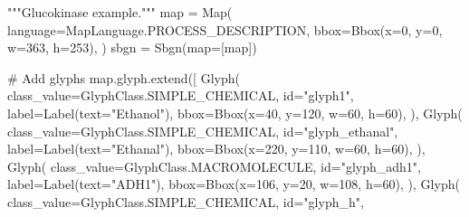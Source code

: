 \documentclass[
  letterpaper,
  DIV=11,
  numbers=noendperiod]{scrartcl}
\newenvironment{Shaded}{\begin{snugshade}}{\end{snugshade}}
\newcommand{\BuiltInTok}[1]{\textcolor[rgb]{0.00,0.23,0.31}{#1}}
\newcommand{\CommentTok}[1]{\textcolor[rgb]{0.37,0.37,0.37}{#1}}
\newcommand{\DecValTok}[1]{\textcolor[rgb]{0.68,0.00,0.00}{#1}}
\newcommand{\NormalTok}[1]{\textcolor[rgb]{0.00,0.23,0.31}{#1}}
\newcommand{\OperatorTok}[1]{\textcolor[rgb]{0.37,0.37,0.37}{#1}}
\newcommand{\StringTok}[1]{\textcolor[rgb]{0.13,0.47,0.30}{#1}}
\begin{document}
\begin{Shaded}
\begin{Highlighting}[]
\CommentTok{"""Glucokinase example."""}
\BuiltInTok{map} \OperatorTok{=}\NormalTok{ Map(}
\NormalTok{    language}\OperatorTok{=}\NormalTok{MapLanguage.PROCESS\_DESCRIPTION,}
\NormalTok{    bbox}\OperatorTok{=}\NormalTok{Bbox(x}\OperatorTok{=}\DecValTok{0}\NormalTok{, y}\OperatorTok{=}\DecValTok{0}\NormalTok{, w}\OperatorTok{=}\DecValTok{363}\NormalTok{, h}\OperatorTok{=}\DecValTok{253}\NormalTok{),}
\NormalTok{)}
\NormalTok{sbgn }\OperatorTok{=}\NormalTok{ Sbgn(}\BuiltInTok{map}\OperatorTok{=}\NormalTok{[}\BuiltInTok{map}\NormalTok{])}

\CommentTok{\# Add glyphs}
\BuiltInTok{map}\NormalTok{.glyph.extend([}
\NormalTok{    Glyph(}
\NormalTok{        class\_value}\OperatorTok{=}\NormalTok{GlyphClass.SIMPLE\_CHEMICAL,}
        \BuiltInTok{id}\OperatorTok{=}\StringTok{"glyph1"}\NormalTok{,}
\NormalTok{        label}\OperatorTok{=}\NormalTok{Label(text}\OperatorTok{=}\StringTok{"Ethanol"}\NormalTok{),}
\NormalTok{        bbox}\OperatorTok{=}\NormalTok{Bbox(x}\OperatorTok{=}\DecValTok{40}\NormalTok{, y}\OperatorTok{=}\DecValTok{120}\NormalTok{, w}\OperatorTok{=}\DecValTok{60}\NormalTok{, h}\OperatorTok{=}\DecValTok{60}\NormalTok{),}
\NormalTok{    ),}
\NormalTok{    Glyph(}
\NormalTok{        class\_value}\OperatorTok{=}\NormalTok{GlyphClass.SIMPLE\_CHEMICAL,}
        \BuiltInTok{id}\OperatorTok{=}\StringTok{"glyph\_ethanal"}\NormalTok{,}
\NormalTok{        label}\OperatorTok{=}\NormalTok{Label(text}\OperatorTok{=}\StringTok{"Ethanal"}\NormalTok{),}
\NormalTok{        bbox}\OperatorTok{=}\NormalTok{Bbox(x}\OperatorTok{=}\DecValTok{220}\NormalTok{, y}\OperatorTok{=}\DecValTok{110}\NormalTok{, w}\OperatorTok{=}\DecValTok{60}\NormalTok{, h}\OperatorTok{=}\DecValTok{60}\NormalTok{),}
\NormalTok{    ),}
\NormalTok{    Glyph(}
\NormalTok{        class\_value}\OperatorTok{=}\NormalTok{GlyphClass.MACROMOLECULE,}
        \BuiltInTok{id}\OperatorTok{=}\StringTok{"glyph\_adh1"}\NormalTok{,}
\NormalTok{        label}\OperatorTok{=}\NormalTok{Label(text}\OperatorTok{=}\StringTok{"ADH1"}\NormalTok{),}
\NormalTok{        bbox}\OperatorTok{=}\NormalTok{Bbox(x}\OperatorTok{=}\DecValTok{106}\NormalTok{, y}\OperatorTok{=}\DecValTok{20}\NormalTok{, w}\OperatorTok{=}\DecValTok{108}\NormalTok{, h}\OperatorTok{=}\DecValTok{60}\NormalTok{),}
\NormalTok{    ),}
\NormalTok{    Glyph(}
\NormalTok{        class\_value}\OperatorTok{=}\NormalTok{GlyphClass.SIMPLE\_CHEMICAL,}
        \BuiltInTok{id}\OperatorTok{=}\StringTok{"glyph\_h"}\NormalTok{,}

\end{Highlighting}
\end{Shaded}
\end{document}
